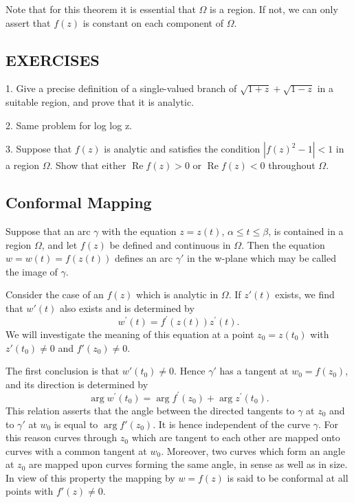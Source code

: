 Note that for this theorem it is essential that $\Omega$ is a region. If not, we can only assert that $f(z)$ is constant on each component of $\Omega$.

\subsection*{EXERCISES}
1. Give a precise definition of a single-valued branch of $\sqrt{1 + z} + \sqrt{1 - z}$ in a suitable region, and prove that it is analytic.

2. Same problem for log log z.

3. Suppose that $f(z)$ is analytic and satisfies the condition $|f(z)^{2}-1|<1$ in a region $\Omega$. Show that either $\operatorname{Re} f(z)>0$ or $\operatorname{Re} f(z)<0$ throughout $\Omega$.


\setcounter{section}{2}\setcounter{subsection}{2}\subsection{Conformal Mapping}\label{sec:3.2.3}
Suppose that an arc $\gamma$ with the equation $z = z(t)$, $\alpha \leq t \leq \beta$, is contained in a region $\Omega$, and let $f(z)$ be defined and continuous in $\Omega$. Then the equation $w = w(t) = f(z(t))$ defines an arc $\gamma'$ in the w-plane which may be called the image of $\gamma$.

Consider the case of an $f(z)$ which is analytic in $\Omega$. If $z'(t)$ exists, we find that $w'(t)$ also exists and is determined by
\begin{equation*}
w ^ {\prime} (t) = f ^ {\prime} (z (t)) z ^ {\prime} (t).\tag{1}\label{eq:3.1}
\end{equation*}
We will investigate the meaning of this equation at a point $z_0 = z(t_0)$ with $z'(t_0) \neq 0$ and $f'(z_0) \neq 0$.

The first conclusion is that $w'(t_0) \neq 0$. Hence $\gamma'$ has a tangent at $w_0 = f(z_0)$, and its direction is determined by
\begin{equation*}
\arg w ^ {\prime} (t _ {0}) = \arg f ^ {\prime} (z _ {0}) + \arg z ^ {\prime} (t _ {0}).\tag{2}\label{eq:3.2}
\end{equation*}
This relation asserts that the angle between the directed tangents to $\gamma$ at $z_{0}$ and to $\gamma'$ at $w_{0}$ is equal to $\arg f'(z_{0})$. It is hence independent of the curve $\gamma$. For this reason curves through $z_{0}$ which are tangent to each other are mapped onto curves with a common tangent at $w_{0}$. Moreover, two curves which form an angle at $z_{0}$ are mapped upon curves forming the same angle, in sense as well as in size. In view of this property the mapping by $w = f(z)$ is said to be conformal at all points with $f'(z) \neq 0$.

